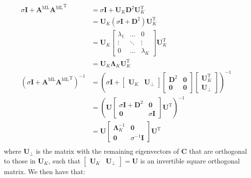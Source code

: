 \documentclass[a4paper]{article}
\begin{document}
\begin{align*}
\sigma \mathbf{I} + {\mathbf{A}^\textrm{ML}\mathbf{A}^\textrm{ML}}^\textrm{T} &= \sigma \mathbf{I} + \mathbf{U}_K\mathbf{D}^2\mathbf{U}_K^\textrm{T} \\
&= \mathbf{U}_K (\sigma \mathbf{I} + \mathbf{D}^2)\mathbf{U}_K^\textrm{T} \\
&= \mathbf{U}_K
\begin{bmatrix}
\lambda_1 & \ldots & 0 \\
\vdots & \ddots & \vdots \\
0 & \ldots & \lambda_K 
\end{bmatrix}
\mathbf{U}_K^\textrm{T} \\
&= \mathbf{U}_K \mathbf{\Lambda}_K \mathbf{U}_K^\textrm{T} \\
\left(\sigma \mathbf{I} + {\mathbf{A}^\textrm{ML}\mathbf{A}^\textrm{ML}}^\textrm{T}\right)^{-1} &= \left(\sigma \mathbf{I} + \begin{bmatrix} \mathbf{U}_K & \mathbf{U}_\perp \end{bmatrix} \begin{bmatrix} \mathbf{D}^2 & \mathbf{0} \\ \mathbf{0} & \mathbf{0} \end{bmatrix} \begin{bmatrix} \mathbf{U}_K^\textrm{T} \\ \mathbf{U}_\perp \end{bmatrix} \right)^{-1} \\
&= \left(\mathbf{U} \begin{bmatrix} \sigma \mathbf{I} + \mathbf{D}^2 & \mathbf{0} \\ \mathbf{0} & \sigma \mathbf{I} \end{bmatrix} \mathbf{U}^\textrm{T} \right)^{-1} \\
&= \mathbf{U} \begin{bmatrix} \mathbf{\Lambda}_K^{-1} & \mathbf{0} \\ \mathbf{0} & \sigma^{-1} \mathbf{I} \end{bmatrix} \mathbf{U}^\textrm{T} \\
\end{align*}
where $\mathbf{U}_\perp$ is the matrix with the remaining eigenvectors of $\mathbf{C}$ that are orthogonal to those in $\mathbf{U}_K$, such that $\begin{bmatrix} \mathbf{U}_K & \mathbf{U}_\perp \end{bmatrix} = \mathbf{U}$ is an invertible square orthogonal matrix. We then have that:
\end{document}
